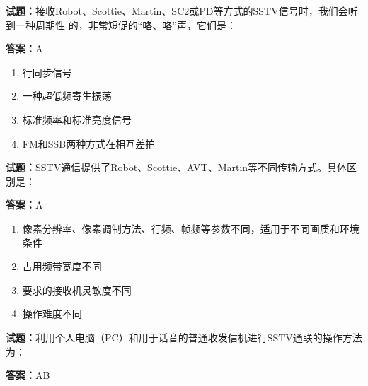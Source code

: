 \documentclass{ctexbook}
\begin{document}




\vspace{1em}

\textbf{试题：}接收Robot、Scottie、Martin、SC2或PD等方式的SSTV信号时，我们会听到一种周期性
的，非常短促的“咯、咯”声，它们是： 

\textbf{答案：}A 

\begin{enumerate}[leftmargin=3em]
  \item 行同步信号 

  \item 一种超低频寄生振荡 

  \item 标准频率和标准亮度信号 

  \item FM和SSB两种方式在相互差拍 

\end{enumerate}





\vspace{1em}

\textbf{试题：}SSTV通信提供了Robot、Scottie、AVT、Martin等不同传输方式。具体区别是： 

\textbf{答案：}A 

\begin{enumerate}[leftmargin=3em]
  \item 像素分辨率、像素调制方法、行频、帧频等参数不同，适用于不同画质和环境条件 

  \item 占用频带宽度不同 

  \item 要求的接收机灵敏度不同 

  \item 操作难度不同 

\end{enumerate}





\vspace{1em}

\textbf{试题：}利用个人电脑（PC）和用于话音的普通收发信机进行SSTV通联的操作方法为： 

\textbf{答案：}AB 
\end{document}

